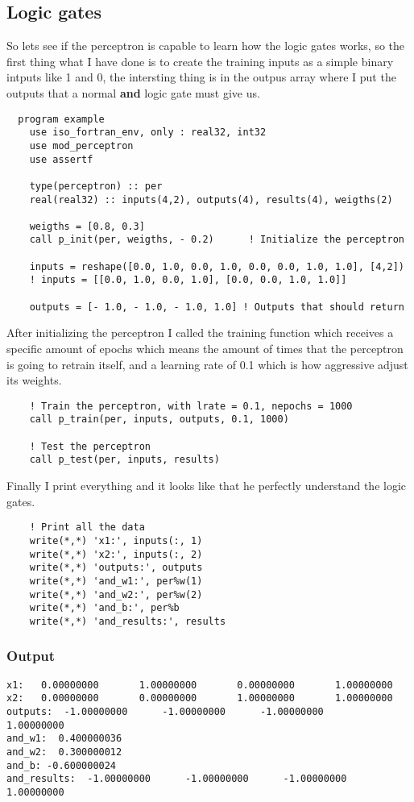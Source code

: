\subsection{Logic gates}
So lets see if the perceptron is capable to learn how the logic gates works, so the first
thing what I have done is to create the training inputs as a simple binary intputs like 1 and 0,
the intersting thing is in the outpus array where I put the outputs that a normal \textbf{and} logic gate
must give us.
\begin{lstlisting}
  program example
    use iso_fortran_env, only : real32, int32
    use mod_perceptron
    use assertf

    type(perceptron) :: per
    real(real32) :: inputs(4,2), outputs(4), results(4), weigths(2)

    weigths = [0.8, 0.3]
    call p_init(per, weigths, - 0.2)      ! Initialize the perceptron

    inputs = reshape([0.0, 1.0, 0.0, 1.0, 0.0, 0.0, 1.0, 1.0], [4,2])
    ! inputs = [[0.0, 1.0, 0.0, 1.0], [0.0, 0.0, 1.0, 1.0]]

    outputs = [- 1.0, - 1.0, - 1.0, 1.0] ! Outputs that should return

\end{lstlisting}
After initializing the perceptron I called the training function which receives a specific
amount of epochs which means the amount of times that the perceptron is going to retrain itself,
and a learning rate of 0.1 which is how aggressive adjust its weights.
\begin{lstlisting}
    ! Train the perceptron, with lrate = 0.1, nepochs = 1000
    call p_train(per, inputs, outputs, 0.1, 1000)

    ! Test the perceptron
    call p_test(per, inputs, results)
\end{lstlisting}
Finally I print everything and it looks like that he perfectly understand the logic gates.
\begin{lstlisting}
    ! Print all the data
    write(*,*) 'x1:', inputs(:, 1)
    write(*,*) 'x2:', inputs(:, 2)
    write(*,*) 'outputs:', outputs
    write(*,*) 'and_w1:', per%w(1)
    write(*,*) 'and_w2:', per%w(2)
    write(*,*) 'and_b:', per%b
    write(*,*) 'and_results:', results
\end{lstlisting}
\subsubsection{Output}
\begin{verbatim}
x1:   0.00000000       1.00000000       0.00000000       1.00000000    
x2:   0.00000000       0.00000000       1.00000000       1.00000000    
outputs:  -1.00000000      -1.00000000      -1.00000000       1.00000000    
and_w1:  0.400000036    
and_w2:  0.300000012    
and_b: -0.600000024    
and_results:  -1.00000000      -1.00000000      -1.00000000       1.00000000
\end{verbatim}

